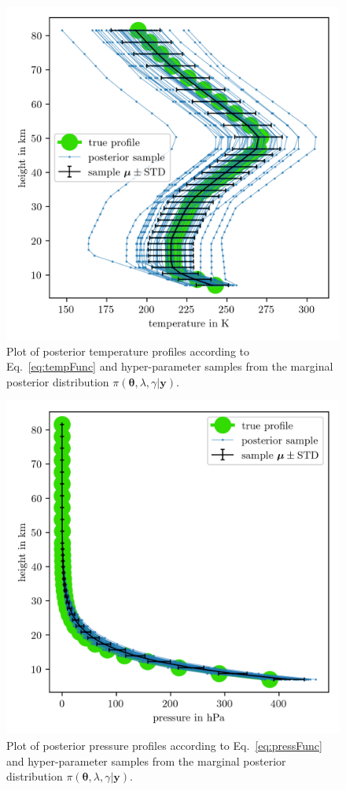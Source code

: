 \begin{figure}[ht!]
	\centering
	\includegraphics{TempPostMeanSigm.png} 
	\caption[Temperature posterior samples.]{Plot of posterior temperature profiles according to Eq.~\ref{eq:tempFunc} and hyper-parameter samples from the marginal posterior distribution $\pi(\bm{\theta},\lambda,\gamma  | \bm{y})$.}
	\label{fig:TempPost}
\end{figure}
\begin{figure}[ht!]
	\centering
	\includegraphics{PressPostMeanSigm.png}
	\caption[Pressure posterior samples.]{Plot of posterior pressure profiles according to Eq.~\ref{eq:pressFunc} and hyper-parameter samples from the marginal posterior distribution $\pi(\bm{\theta},\lambda,\gamma  | \bm{y})$.}
	\label{fig:PressPost}
\end{figure}
\clearpage

